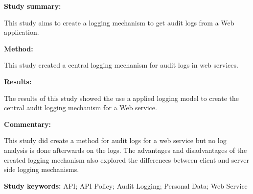 \begin{tcolorbox}[colback=gray!5!white, colframe=pastelgreen!40!black, title=Central Audit Logging Mechanism in Personal Data Web Services\cite{Hasiloglu2018}]
	\begin{minipage}[t]{0.25\textwidth}
		\textbf{Study summary:}
	\end{minipage}
	\hfill
	\begin{minipage}[t]{0.65\textwidth}
		This study aims to create a logging mechanism to get audit logs from a Web application.
	\end{minipage}

	\vspace{0.75em} 

	\begin{minipage}[t]{0.25\textwidth}
		\textbf{Method:}
	\end{minipage}
	\hfill
	\begin{minipage}[t]{0.65\textwidth}
		This study created a central logging mechanism for audit logs in web services.
	\end{minipage}

	\vspace{0.75em} 

	\begin{minipage}[t]{0.25\textwidth}
		\textbf{Results:}
	\end{minipage}
	\hfill
	\begin{minipage}[t]{0.65\textwidth}
		The results of this study showed the use a applied logging model to create the central audit logging mechanism for a Web service.	
	\end{minipage}

	\vspace{0.75em} 

	\begin{minipage}[t]{0.25\textwidth}
		\textbf{Commentary:}
	\end{minipage}
	\hfill
	\begin{minipage}[t]{0.65\textwidth}
		This study did create a method for audit logs for a web service but no log analysis is done afterwards on the logs. The advantages and disadvantages of the created logging mechanism also explored the differences between client and server side logging mechanisms. 
	\end{minipage}
	\tcblower
	\textbf{Study keywords:} API; API Policy; Audit Logging; Personal Data; Web Service
\end{tcolorbox}

